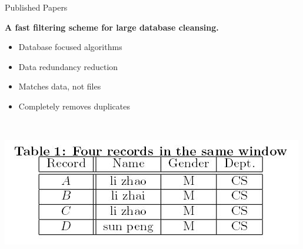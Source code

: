\begin{frame}[t]{Published Papers}

  \hspace*{.6in}
  \begin{minipage}{3.5in}
  \begin{center}
	\vspace*{.3in}
	\textbf{A fast filtering scheme for large database cleansing.}\\
	\begin{itemize}
	\renewcommand{\labelitemi}{$\bullet$}
		\item Database focused algorithms
		\item Data redundancy reduction
		\item Matches data, not files
		\item Completely removes duplicates
	\end{itemize}\\
	\vspace*{.3in}

  \includegraphics[scale=.40]{duptable.JPG}
  
  \end{center}
  \end{minipage}

\end{frame}